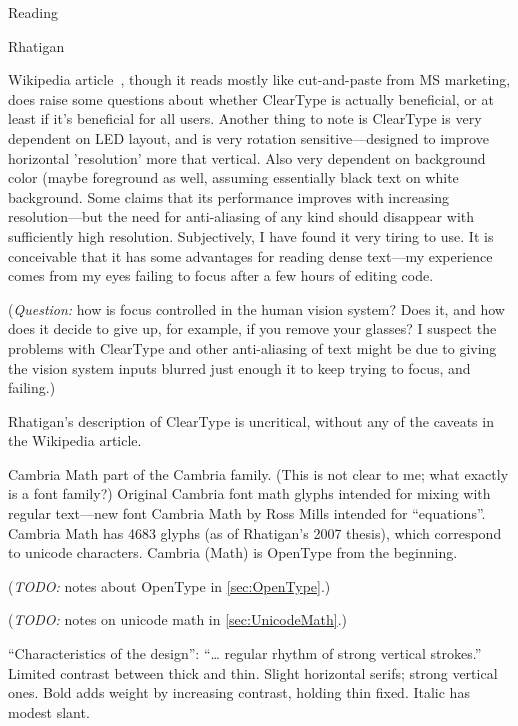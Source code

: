 \documentclass[11pt]{PalisadesLakesBook}
\begin{document}
\begin{plSection}{Reading}
\begin{plSection}{Rhatigan}
\begin{plSection}{}
\begin{plSection}{}
Wikipedia article~\cite{wiki:ClearType},
though it reads mostly like cut-and-paste from MS marketing,
does raise some questions about whether ClearType is actually
beneficial, or at least if it's beneficial for all users.
Another thing to note is ClearType is very dependent 
on LED layout, and is very rotation sensitive---designed
to improve horizontal 'resolution' more that vertical.
Also very dependent on background color (maybe foreground as well,
assuming essentially black text on white background.
Some claims that its performance improves with increasing
resolution---but the need for anti-aliasing of any kind should
disappear with sufficiently high resolution.
Subjectively, I have found it very tiring to use.
It is conceivable that it has some advantages for reading
dense text---my experience comes from my eyes failing to focus 
after a few hours of editing code.  

(\emph{Question:} how is focus controlled in the human vision
system? Does it, and how does it decide to give up, for example, 
if you remove your glasses? I suspect the problems with
ClearType and other anti-aliasing of text might be due to 
giving the vision system inputs blurred just enough
it to keep trying to focus, and failing.)

Rhatigan's description of ClearType is uncritical, without any
of the caveats in the Wikipedia article.

Cambria Math part of the Cambria family.
(This is not clear to me; what exactly is a font family?)
Original Cambria font math glyphs intended for mixing with regular
text---new font Cambria Math by Ross Mills intended for 
``equations''.
Cambria Math has 4683 glyphs (as of Rhatigan's 2007 thesis),
which correspond to unicode characters.
Cambria (Math) is OpenType from the beginning.

(\emph{TODO:} notes about OpenType in \cref{sec:OpenType}.)

(\emph{TODO:} notes on unicode math in \cref{sec:UnicodeMath}.)

``Characteristics of the design'': 
``{\ldots} regular rhythm of strong vertical strokes.''
Limited contrast between thick and thin. 
Slight horizontal serifs; strong vertical ones.
Bold adds weight by increasing contrast, holding thin fixed.
Italic has modest slant.


\end{plSection}
\end{plSection}
\end{plSection}
\end{plSection}
\end{document}
